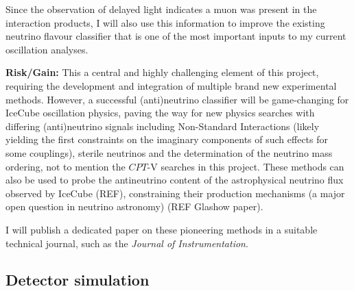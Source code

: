 \documentclass[a4paper,11pt]{article}
\begin{document}
Since the observation of delayed light indicates a muon was present in the interaction products, I will also use this information to improve the existing neutrino flavour classifier that is one of the most important inputs to my current oscillation analyses. 

\textbf{Risk/Gain:} This a central and highly challenging element of this project, requiring the development and integration of multiple brand new experimental methods. However, a successful (anti)neutrino classifier will be game-changing for IceCube oscillation physics, paving the way for new physics searches with differing (anti)neutrino signals including Non-Standard Interactions (likely yielding the first constraints on the imaginary components of such effects for some couplings), sterile neutrinos and the determination of the neutrino mass ordering, not to mention the $CPT$-V searches in this project. These methods can also be used to probe the antineutrino content of the astrophysical neutrino flux observed by IceCube (REF), constraining their production mechanisms (a major open question in neutrino astronomy) (REF Glashow paper).

I will publish a dedicated paper on these pioneering methods in a suitable technical journal, such as the \textit{Journal of Instrumentation}. \\






\subsection{Detector simulation}
\end{document}
